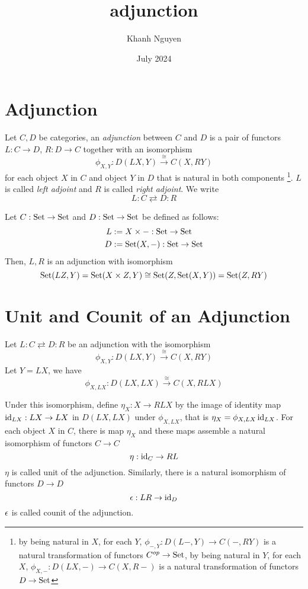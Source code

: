 \documentclass{article}
\title{adjunction}
\author{Khanh Nguyen}
\date{July 2024}
\begin{document}
\maketitle

\section{Adjunction}

\begin{definition}[adjunction]
    Let $C, D$ be categories, an \textit{adjunction} between $C$ and $D$ is a pair of functors $L: C \to D$, $R: D \to C$ together with an isomorphism
    $$
        \phi_{X, Y}: D(LX, Y) \xrightarrow{\cong} C(X, RY)
    $$
    for each object $X$ in $C$ and object $Y$ in $D$ that is natural in both components \footnote{by being natural in $X$, for each $Y$, $\phi_{-, Y}: D(L-, Y) \to C(-, RY)$ is a natural transformation of functors $C^{op} \to \operatorname{Set}$, by being natural in $Y$, for each $X$, $\phi_{X, -}: D(LX, -) \to C(X, R-)$ is a natural transformation of functors $D \to \operatorname{Set}$}. $L$ is called \textit{left adjoint} and $R$ is called \textit{right adjoint}. We write 
    $$
        L: C \rightleftarrows D: R
    $$
\end{definition}

\begin{example}
    Let $C: \operatorname{Set} \to \operatorname{Set}$ and $D: \operatorname{Set} \to \operatorname{Set}$ be defined as follows:
    \begin{align*}
        L &:= X \times - : \operatorname{Set} \to \operatorname{Set} \\
        D &:= \operatorname{Set}(X, -) : \operatorname{Set} \to \operatorname{Set}
    \end{align*}
    Then, $L, R$ is an adjunction with isomorphism
    $$
        \operatorname{Set}(LZ, Y) = \operatorname{Set}(X \times Z, Y) \cong \operatorname{Set}(Z, \operatorname{Set}(X, Y)) = \operatorname{Set}(Z, RY)
    $$
\end{example}

\section{Unit and Counit of an Adjunction}

\begin{definition}
    Let $L: C \rightleftarrows D: R$ be an adjunction with the isomorphism
    $$
        \phi_{X, Y}: D(LX, Y) \xrightarrow{\cong} C(X, RY)
    $$
    Let $Y = LX$, we have
    $$
        \phi_{X, LX}: D(LX, LX) \xrightarrow{\cong} C(X, RLX)
    $$

    Under this isomorphism, define $\eta_X: X \to RLX$ by the image of identity map $\operatorname{id}_{LX}: LX \to LX$ in $D(LX, LX)$ under $\phi_{X, LX}$, that is $\eta_X = \phi_{X, LX} \operatorname{id}_{LX}$. For each object $X$ in $C$, there is map $\eta_X$ and these maps assemble a natural isomorphism of functors $C \to C$
    $$
        \eta: \operatorname{id}_C \to RL
    $$
    $\eta$ is called unit of the adjunction. Similarly, there is a natural isomorphism of functors $D \to D$
    $$
        \epsilon: LR \to \operatorname{id}_D
    $$
    $\epsilon$ is called counit of the adjunction.
\end{definition}
\end{document}
